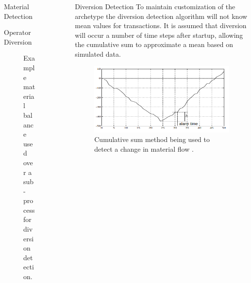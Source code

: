 \documentclass[final]{beamer}
\newlength{\sepwid}
\newlength{\onecolwid}
\newlength{\threecolwid}
\begin{document}
\begin{frame}[t]
\begin{columns}[t,totalwidth=\threecolwid]
\begin{column}{\onecolwid}
\begin{block}{Material Detection}
\begin{block} {Operator Diversion}
\begin{figure}
			\caption{Example material balance used over a sub-process for diversion detection.}
		\end{figure}
	\end{block}
	
\end{block}



\end{column} %

\begin{column}{\sepwid}\end{column} %

\begin{column}{\onecolwid} %
	
\begin{block}{Diversion Detection}
	To maintain customization of the archetype the diversion detection algorithm will not know mean values for transactions.
	It is assumed that diversion will occur a number of time steps after startup, allowing the cumulative sum to approximate a mean
	based on simulated data.
	\begin{figure}
		\includegraphics[width=0.9\linewidth]{cusum-example.png}
		\caption{Cumulative sum method being used to detect a change in material flow \cite{Yilmaz_2016}.}
	\end{figure}
	
\end{block}


\end{column}
\end{columns}
\end{frame}
\end{document}
